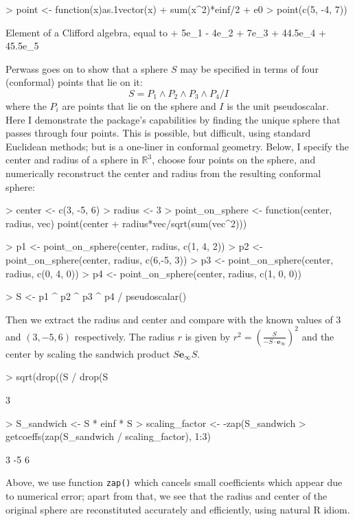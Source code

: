 \documentclass{birkjour}
\theoremstyle{definition}
\theoremstyle{remark}
\numberwithin{equation}{section}
\newcommand{\einf}{\mathbf{e}_\infty}
\renewenvironment{Schunk}{\vspace{20pt}}{\vspace{20pt}}
\begin{document}
\begin{Schunk}
\begin{Sinput}
> point <- function(x){as.1vector(x) + sum(x^2)*einf/2 + e0}
> point(c(5, -4, 7))
\end{Sinput}
\begin{Soutput}
Element of a Clifford algebra, equal to
+ 5e_1 - 4e_2 + 7e_3 + 44.5e_4 + 45.5e_5
\end{Soutput}
\end{Schunk}
%
{
Perwass goes on to show that a sphere $S$ may be specified in terms of
four (conformal) points that lie on it:
%
\begin{equation}
  S = P_1\wedge P_2\wedge P_3\wedge P_4/ I
\end{equation}
%
where the $P_i$ are points that lie on the sphere and $I$ is the unit
pseudoscalar.  Here I demonstrate the package's capabilities by
finding the unique sphere that passes through four points.  This is
possible, but difficult, using standard Euclidean methods; but is a
one-liner in conformal geometry.  Below, I specify the center and
radius of a sphere in $\mathbb{R}^3$, choose four points on the
sphere, and numerically reconstruct the center and radius from the
resulting conformal sphere:}
%
\begin{Schunk}
\begin{Sinput}
> center <- c(3, -5, 6)
> radius <- 3
> point_on_sphere  <- function(center, radius, vec){
  point(center + radius*vec/sqrt(sum(vec^2)))
}

> p1 <- point_on_sphere(center, radius, c(1, 4, 2))
> p2 <- point_on_sphere(center, radius, c(6,-5, 3))
> p3 <- point_on_sphere(center, radius, c(0, 4, 0))
> p4 <- point_on_sphere(center, radius, c(1, 0, 0))

> S <- p1 ^ p2 ^ p3 ^ p4 / pseudoscalar()            
\end{Sinput}
\end{Schunk}
%
Then we extract the radius and center and compare with the known
values of $3$ and $(3,-5,6)$ respectively.  The radius $r$ is given by
$r^2 = \left(\frac{S}{-S\cdot\einf}\right)^2$ and the center by
scaling the sandwich product $S\einf S$.

\begin{Schunk}
\begin{Sinput}
> sqrt(drop((S / drop(S %
\end{Sinput}
\begin{Soutput}
[1]  3
\end{Soutput}
\begin{Sinput}
> S_sandwich <- S * einf * S 
> scaling_factor <- -zap(S_sandwich %
> getcoeffs(zap(S_sandwich / scaling_factor), 1:3)
\end{Sinput}
\begin{Soutput}
[1]  3 -5 6
\end{Soutput}
\end{Schunk}
%
Above, we use function {\tt zap()} which cancels small coefficients
which appear due to numerical error; apart from that, we see that the
radius and center of the original sphere are reconstituted accurately
and efficiently, using natural R idiom.
\end{document}
